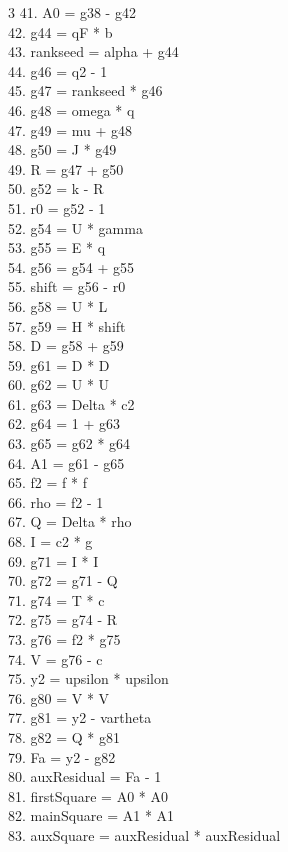 \documentclass[10pt]{article}
\begin{document}
\begin{multicols}{3}
41. A0 = g38 - g42\\
42. g44 = qF * b\\
43. rankseed = alpha + g44\\
44. g46 = q2 - 1\\
45. g47 = rankseed * g46\\
46. g48 = omega * q\\
47. g49 = mu + g48\\
48. g50 = J * g49\\
49. R = g47 + g50\\
50. g52 = k - R\\
51. r0 = g52 - 1\\
52. g54 = U * gamma\\
53. g55 = E * q\\
54. g56 = g54 + g55\\
55. shift = g56 - r0\\
56. g58 = U * L\\
57. g59 = H * shift\\
58. D = g58 + g59\\
59. g61 = D * D\\
60. g62 = U * U\\
61. g63 = Delta * c2\\
62. g64 = 1 + g63\\
63. g65 = g62 * g64\\
64. A1 = g61 - g65\\
65. f2 = f * f\\
66. rho = f2 - 1\\
67. Q = Delta * rho\\
68. I = c2 * g\\
69. g71 = I * I\\
70. g72 = g71 - Q\\
71. g74 = T * c\\
72. g75 = g74 - R\\
73. g76 = f2 * g75\\
74. V = g76 - c\\
75. y2 = upsilon * upsilon\\
76. g80 = V * V\\
77. g81 = y2 - vartheta\\
78. g82 = Q * g81\\
79. Fa = y2 - g82\\
80. auxResidual = Fa - 1\\
81. firstSquare = A0 * A0\\
82. mainSquare = A1 * A1\\
83. auxSquare = auxResidual * auxResidual\\

\end{multicols}
\end{document}
